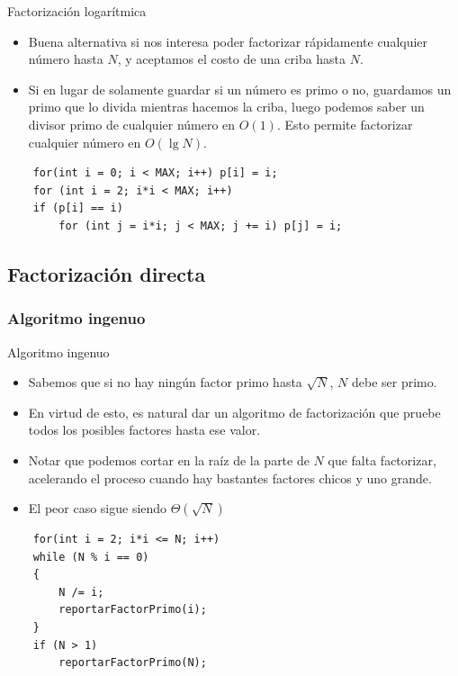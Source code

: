 \documentclass{beamer}
\begin{document}
\begin{frame}[fragile]{Factorización logarítmica}
  \begin{itemize}
      \item Buena alternativa si nos interesa poder factorizar rápidamente cualquier número hasta $N$, y aceptamos el costo de una criba hasta $N$.
      \item Si en lugar de solamente guardar si un número es primo o no, guardamos un primo que lo divida mientras hacemos la criba, luego podemos saber un divisor primo de cualquier número en $O(1)$. Esto permite factorizar cualquier número en $O(\lg N)$.
  \end{itemize}

\begin{lstlisting}
    for(int i = 0; i < MAX; i++) p[i] = i;
    for (int i = 2; i*i < MAX; i++)
    if (p[i] == i)
        for (int j = i*i; j < MAX; j += i) p[j] = i;
\end{lstlisting}
\end{frame}

\subsection{Factorización directa}

\subsubsection{Algoritmo ingenuo}

\begin{frame}[fragile]{Algoritmo ingenuo}
  \begin{itemize}
      \item Sabemos que si no hay ningún factor primo hasta $\sqrt{N}$, $N$ debe ser primo.
      \item En virtud de esto, es natural dar un algoritmo de factorización que pruebe todos los posibles factores hasta ese valor.
      \item Notar que podemos cortar en la raíz de la parte de $N$ que falta factorizar, acelerando el proceso cuando hay bastantes factores chicos y uno grande.
      \item El peor caso sigue siendo $\Theta(\sqrt{N})$
  \end{itemize}

\begin{lstlisting}
    for(int i = 2; i*i <= N; i++)
    while (N % i == 0)
    {
        N /= i;
        reportarFactorPrimo(i);
    }
    if (N > 1)
        reportarFactorPrimo(N);
\end{lstlisting}
\end{frame}
\end{document}
